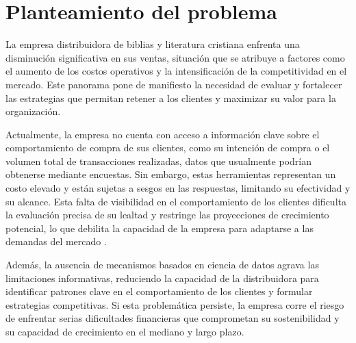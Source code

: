 
\section{Planteamiento del problema}

La empresa distribuidora de biblias y literatura cristiana enfrenta una disminución significativa en sus ventas, situación que se atribuye a factores como el aumento de los costos operativos y la intensificación de la competitividad en el mercado. Este panorama pone de manifiesto la necesidad de evaluar y fortalecer las estrategias que permitan retener a los clientes y maximizar su valor para la organización.

Actualmente, la empresa no cuenta con acceso a información clave sobre el comportamiento de compra de sus clientes, como su intención de compra o el volumen total de transacciones realizadas, datos que usualmente podrían obtenerse mediante encuestas. Sin embargo, estas herramientas representan un costo elevado y están sujetas a sesgos en las respuestas, limitando su efectividad y su alcance. Esta falta de visibilidad en el comportamiento de los clientes dificulta la evaluación precisa de su lealtad y restringe las proyecciones de crecimiento potencial, lo que debilita la capacidad de la empresa para adaptarse a las demandas del mercado \cite{glady2009predicting}.

Además, la ausencia de mecanismos basados en ciencia de datos agrava las limitaciones informativas, reduciendo la capacidad de la distribuidora para identificar patrones clave en el comportamiento de los clientes y formular estrategias competitivas. Si esta problemática persiste, la empresa corre el riesgo de enfrentar serias dificultades financieras que comprometan su sostenibilidad y su capacidad de crecimiento en el mediano y largo plazo.